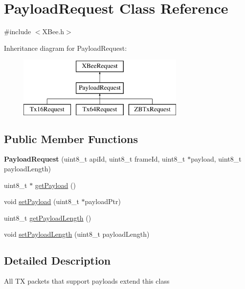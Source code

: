 \hypertarget{classPayloadRequest}{\section{\-Payload\-Request \-Class \-Reference}
\label{classPayloadRequest}
}


{\ttfamily \#include $<$\-X\-Bee.\-h$>$}

\-Inheritance diagram for \-Payload\-Request\-:\begin{figure}[H]
\begin{center}
\leavevmode
\includegraphics[height=3.000000cm]{classPayloadRequest}
\end{center}
\end{figure}
\subsection*{\-Public \-Member \-Functions}
\begin{DoxyCompactItemize}
\item 
\hypertarget{classPayloadRequest_a22cc9fd971a1334346560689d7d8c8d5}{{\bfseries \-Payload\-Request} (uint8\-\_\-t api\-Id, uint8\-\_\-t frame\-Id, uint8\-\_\-t $\ast$payload, uint8\-\_\-t payload\-Length)}\label{classPayloadRequest_a22cc9fd971a1334346560689d7d8c8d5}

\item 
uint8\-\_\-t $\ast$ \hyperlink{classPayloadRequest_a1e2d5757fefda70dfd0c567b3dd0ba39}{get\-Payload} ()
\item 
void \hyperlink{classPayloadRequest_aa9abc1f496a1c457f796207aa8a7567d}{set\-Payload} (uint8\-\_\-t $\ast$payload\-Ptr)
\item 
uint8\-\_\-t \hyperlink{classPayloadRequest_afb718d069f05611623833437c99893a4}{get\-Payload\-Length} ()
\item 
void \hyperlink{classPayloadRequest_a6e86a663ab6299afaa1cf21ad7c2c5c1}{set\-Payload\-Length} (uint8\-\_\-t payload\-Length)
\end{DoxyCompactItemize}


\subsection{\-Detailed \-Description}
\-All \-T\-X packets that support payloads extend this class 

